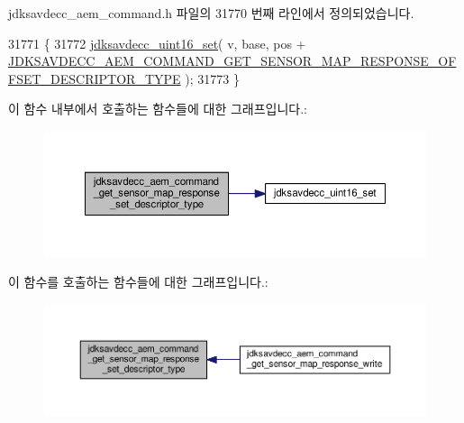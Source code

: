 jdksavdecc\+\_\+aem\+\_\+command.\+h 파일의 31770 번째 라인에서 정의되었습니다.


\begin{DoxyCode}
31771 \{
31772     \hyperlink{group__endian_ga14b9eeadc05f94334096c127c955a60b}{jdksavdecc\_uint16\_set}( v, base, pos + 
      \hyperlink{group__command__get__sensor__map__response_ga428bc8f8f73fb6abd6ae9af55b8d41f4}{JDKSAVDECC\_AEM\_COMMAND\_GET\_SENSOR\_MAP\_RESPONSE\_OFFSET\_DESCRIPTOR\_TYPE}
       );
31773 \}
\end{DoxyCode}


이 함수 내부에서 호출하는 함수들에 대한 그래프입니다.\+:
\nopagebreak
\begin{figure}[H]
\begin{center}
\leavevmode
\includegraphics[width=350pt]{group__command__get__sensor__map__response_ga2b04d5ebb1eeca914ede695946ec394a_cgraph}
\end{center}
\end{figure}




이 함수를 호출하는 함수들에 대한 그래프입니다.\+:
\nopagebreak
\begin{figure}[H]
\begin{center}
\leavevmode
\includegraphics[width=350pt]{group__command__get__sensor__map__response_ga2b04d5ebb1eeca914ede695946ec394a_icgraph}
\end{center}
\end{figure}


